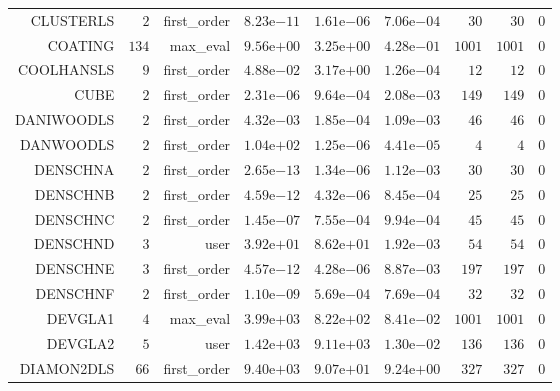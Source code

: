 \begin{longtable}{rrrrrrrrr}
CLUSTERLS & \(     2\) & first\_order & \( 8.23\)e\(-11\) & \( 1.61\)e\(-06\) & \( 7.06\)e\(-04\) & \(    30\) & \(    30\) & \(     0\) \\
COATING & \(   134\) & max\_eval & \( 9.56\)e\(+00\) & \( 3.25\)e\(+00\) & \( 4.28\)e\(-01\) & \(  1001\) & \(  1001\) & \(     0\) \\
COOLHANSLS & \(     9\) & first\_order & \( 4.88\)e\(-02\) & \( 3.17\)e\(+00\) & \( 1.26\)e\(-04\) & \(    12\) & \(    12\) & \(     0\) \\
CUBE & \(     2\) & first\_order & \( 2.31\)e\(-06\) & \( 9.64\)e\(-04\) & \( 2.08\)e\(-03\) & \(   149\) & \(   149\) & \(     0\) \\
DANIWOODLS & \(     2\) & first\_order & \( 4.32\)e\(-03\) & \( 1.85\)e\(-04\) & \( 1.09\)e\(-03\) & \(    46\) & \(    46\) & \(     0\) \\
DANWOODLS & \(     2\) & first\_order & \( 1.04\)e\(+02\) & \( 1.25\)e\(-06\) & \( 4.41\)e\(-05\) & \(     4\) & \(     4\) & \(     0\) \\
DENSCHNA & \(     2\) & first\_order & \( 2.65\)e\(-13\) & \( 1.34\)e\(-06\) & \( 1.12\)e\(-03\) & \(    30\) & \(    30\) & \(     0\) \\
DENSCHNB & \(     2\) & first\_order & \( 4.59\)e\(-12\) & \( 4.32\)e\(-06\) & \( 8.45\)e\(-04\) & \(    25\) & \(    25\) & \(     0\) \\
DENSCHNC & \(     2\) & first\_order & \( 1.45\)e\(-07\) & \( 7.55\)e\(-04\) & \( 9.94\)e\(-04\) & \(    45\) & \(    45\) & \(     0\) \\
DENSCHND & \(     3\) & user & \( 3.92\)e\(+01\) & \( 8.62\)e\(+01\) & \( 1.92\)e\(-03\) & \(    54\) & \(    54\) & \(     0\) \\
DENSCHNE & \(     3\) & first\_order & \( 4.57\)e\(-12\) & \( 4.28\)e\(-06\) & \( 8.87\)e\(-03\) & \(   197\) & \(   197\) & \(     0\) \\
DENSCHNF & \(     2\) & first\_order & \( 1.10\)e\(-09\) & \( 5.69\)e\(-04\) & \( 7.69\)e\(-04\) & \(    32\) & \(    32\) & \(     0\) \\
DEVGLA1 & \(     4\) & max\_eval & \( 3.99\)e\(+03\) & \( 8.22\)e\(+02\) & \( 8.41\)e\(-02\) & \(  1001\) & \(  1001\) & \(     0\) \\
DEVGLA2 & \(     5\) & user & \( 1.42\)e\(+03\) & \( 9.11\)e\(+03\) & \( 1.30\)e\(-02\) & \(   136\) & \(   136\) & \(     0\) \\
DIAMON2DLS & \(    66\) & first\_order & \( 9.40\)e\(+03\) & \( 9.07\)e\(+01\) & \( 9.24\)e\(+00\) & \(   327\) & \(   327\) & \(     0\) \\

\end{longtable}
